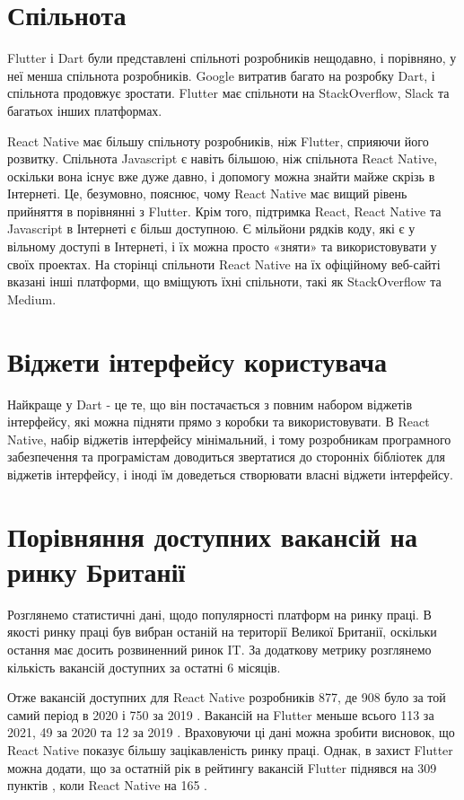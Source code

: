 \section{Спільнота}
\label{sec:communities}

Flutter і Dart були представлені спільноті розробників нещодавно, і порівняно, у неї менша спільнота розробників.
Google витратив багато на розробку Dart, і спільнота продовжує зростати.
Flutter має спільноти на StackOverflow, Slack та багатьох інших платформах.

React Native має більшу спільноту розробників, ніж Flutter, сприяючи його розвитку.
Спільнота Javascript є навіть більшою, ніж спільнота React Native, оскільки вона існує вже дуже давно, і допомогу можна знайти майже скрізь в Інтернеті.
Це, безумовно, пояснює, чому React Native має вищий рівень прийняття в порівнянні з Flutter.
Крім того, підтримка React, React Native та Javascript в Інтернеті є більш доступною.
Є мільйони рядків коду, які є у вільному доступі в Інтернеті, і їх можна просто «зняти» та використовувати у своїх проектах.
На сторінці спільноти React Native на їх офіційному веб-сайті вказані інші платформи, що вміщують їхні спільноти, такі як StackOverflow та Medium.


\section{Віджети інтерфейсу користувача}
\label{sec:widgets}
Найкраще у Dart - це те, що він постачається з повним набором віджетів інтерфейсу, які можна підняти прямо з коробки та використовувати.
В React Native, набір віджетів інтерфейсу мінімальний, і тому розробникам програмного забезпечення та програмістам доводиться звертатися до сторонніх бібліотек для віджетів інтерфейсу, і іноді їм доведеться створювати власні віджети інтерфейсу.


\section{Порівняння доступних вакансій на ринку Британії}
\label{sec:market_comparisson}
Розглянемо статистичні дані, щодо популярності платформ на ринку праці.
В якості ринку праці був вибран останій на території Великої Британії, оскільки остання має досить розвиненний ринок IT.
За додаткову метрику розглянемо кількість вакансій доступних за остатні 6 місяців.

Отже вакансій доступних для React Native розробників 877, де 908 було за той самий період в 2020 і 750 за 2019 \cite{react_native_jobs}.
Вакансій на Flutter меньше всього 113 за 2021, 49 за 2020 та 12 за 2019 \cite{flutter_jobs}.
Враховуючи ці дані можна зробити висновок, що React Native показує більшу зацікавленість ринку праці.
Однак, в захист Flutter можна додати, що за остатній рік в рейтингу вакансій Flutter піднявся на 309 пунктів \cite{flutter_jobs}, коли React Native на 165 \cite{react_native_jobs}.

